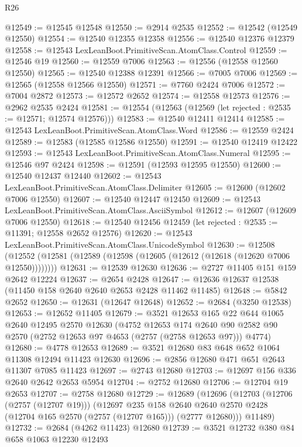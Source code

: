 \begin{lexlean}{R26}
\begin{coremodule}
@12549 := @12545 @12548
@12550 := @2914 @2535
@12552 := @12542 (@12549 @12550)
@12554 := @12540 @12355 @12358
@12556 := @12540 @12376 @12379
@12558 := @12543 LexLeanBoot.PrimitiveScan.AtomClass.Control
@12559 := @12546 @19
@12560 := @12559 @7006
@12563 := @12556 (@12558 @12560 @12550)
@12565 := @12540 @12388 @12391
@12566 := @7005 @7006
@12569 := @12565 (@12558 @12566 @12550)
@12571 := @7760 @2424 @7006
@12572 := @7004 @2872
@12573 := @12572 @2652
@12574 := @12558 @12573
@12576 := @2962 @2535 @2424
@12581 := @12554 (@12563 (@12569 (let rejected : @2535 := @12571; @12574 @12576)))
@12583 := @12540 @12411 @12414
@12585 := @12543 LexLeanBoot.PrimitiveScan.AtomClass.Word
@12586 := @12559 @2424
@12589 := @12583 (@12585 @12586 @12550)
@12591 := @12540 @12419 @12422
@12593 := @12543 LexLeanBoot.PrimitiveScan.AtomClass.Numeral
@12595 := @12546 @97 @2424
@12598 := @12591 (@12593 @12595 @12550)
@12600 := @12540 @12437 @12440
@12602 := @12543 LexLeanBoot.PrimitiveScan.AtomClass.Delimiter
@12605 := @12600 (@12602 @7006 @12550)
@12607 := @12540 @12447 @12450
@12609 := @12543 LexLeanBoot.PrimitiveScan.AtomClass.AsciiSymbol
@12612 := @12607 (@12609 @7006 @12550)
@12618 := @12540 @12456 @12459 (let rejected : @2535 := @11391; @12558 @2652 @12576)
@12620 := @12543 LexLeanBoot.PrimitiveScan.AtomClass.UnicodeSymbol
@12630 := @12508
    (@12552 (@12581 (@12589 (@12598 (@12605 (@12612 (@12618 (@12620 @7006 @12550))))))))
@12631 := @12539 @12630
@12636 := @2727 @11405 @151 @159 @2642 @12224
@12637 := @2654 @2428
@12647 := @12636 @12637 @12538 (@11450 @158 @2640 @2640 @2653 @2428 @11462 @11485)
@12648 := @5842 @2652
@12650 := @12631 (@12647 @12648)
@12652 := @2684 (@3250 @12538)
@12653 := @12652 @11405
@12679 := @3521
    @12653
    @165
    @22
    @644
    @1065
    @2640
    @12495
    @2570
    @12630
    (@4752
      @12653
      @174
      @2640
      @90
      @2582
      @90
      @2570
      (@2752 @12653 @97 @4653 (@2757 (@2758 @12653 @97)))
      @4774)
@12680 := @4778 @12653
@12689 := @3521 @12680 @83 @648 @652 @1064 @11308 @12494 @11423 @12630
@12696 := @2856 @12680 @471 @651 @2643 @11307 @7085 @11423
@12697 := @2743 @12680
@12703 := @12697 @156 @336 @2640 @2642 @2653 @5954
@12704 := @2752 @12680
@12706 := @12704 @19 @2653
@12707 := @2758 @12680
@12729 := @12689
    (@12696
      (@12703
        (@12706 (@2757 (@12707 @19)))
        (@12697
          @235
          @158
          @2640
          @2640
          @2570
          @2428
          (@12704 @165 @2570 (@2757 (@12707 @165)))
          (@2777 @12680)))
      @11489)
@12732 := @2684 (@4262 @11423) @12680
@12739 := @3521 @12732 @380 @84 @658 @1063 @12230 @12493

\end{coremodule}
\end{lexlean}
